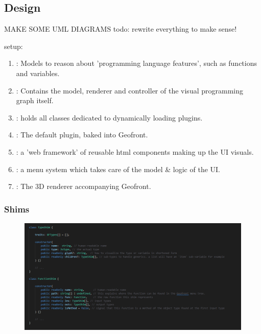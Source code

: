 \subsection*{Design}

\begin{note}
  MAKE SOME UML DIAGRAMS
  todo: rewrite everything to make sense! 
\end{note}

setup: 
\begin{enumerate}[-]
  \item {}: Models to reason about 'programming language features', such as functions and variables.
  \item {}: Contains the model, renderer and controller of the visual programming graph itself.  
  \item {}: holds all classes dedicated to dynamically loading plugins.
  \item {}: The default plugin, baked into Geofront.   
  \item {}: a 'web framework' of reusable html components making up the UI visuals.
  \item {}: a menu system which takes care of the model \& logic of the UI.
  \item {}: The 3D renderer accompanying Geofront.   
\end{enumerate}


\subsubsection*{Shims}

\begin{figure}
  \centering
  \graphicspath{ {../../assets/images/implementation/} }
  \includegraphics[width=\linewidth]{shim-uml.png}
  \caption[Shim Classes]{}
  \label{fig:shim-classes}
\end{figure}

